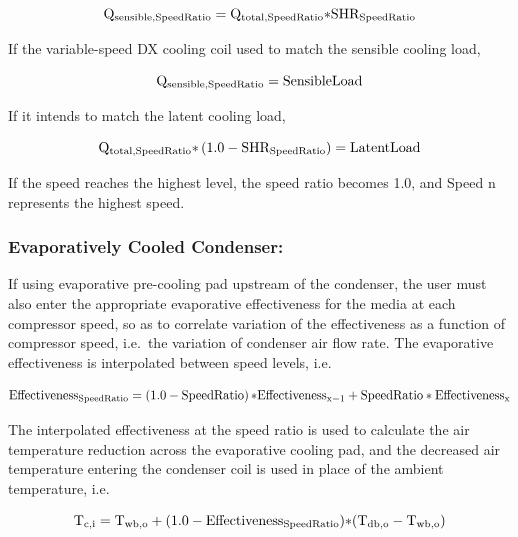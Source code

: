 \begin{equation}
{{\rm{Q}}_{{\rm{sensible}},{\rm{SpeedRatio}}}} = {{\rm{Q}}_{{\rm{total}},{\rm{SpeedRatio}}}}{\rm{*SH}}{{\rm{R}}_{{\rm{SpeedRatio}}}}
\end{equation}

If the variable-speed DX cooling coil used to match the sensible cooling load,

\begin{equation}
{{\rm{Q}}_{{\rm{sensible}},{\rm{SpeedRatio}}}} = {\rm{SensibleLoad}}
\end{equation}

If it intends to match the latent cooling load,

\begin{equation}
{{\rm{Q}}_{{\rm{total}},{\rm{SpeedRatio}}}}{\rm{*}}\left( {1.0 - {\rm{SH}}{{\rm{R}}_{{\rm{SpeedRatio}}}}} \right) = {\rm{LatentLoad}}
\end{equation}

If the speed reaches the highest level, the speed ratio becomes 1.0, and Speed n represents the highest speed.

\subsubsection{Evaporatively Cooled Condenser:}\label{evaporatively-cooled-condenser}

If using evaporative pre-cooling pad upstream of the condenser, the user must also enter the appropriate evaporative effectiveness for the media at each compressor speed, so as to correlate variation of the effectiveness as a function of compressor speed, i.e.~the variation of condenser air flow rate. The evaporative effectiveness is interpolated between speed levels, i.e.

\begin{equation}
{\rm{Effectivenes}}{{\rm{s}}_{{\rm{SpeedRatio}}}} = \left( {1.0 - {\rm{SpeedRatio}}} \right){\rm{*Effectivenes}}{{\rm{s}}_{{\rm{x}} - 1}} + {\rm{SpeedRatio*Effectivenes}}{{\rm{s}}_{\rm{x}}}
\end{equation}

The interpolated effectiveness at the speed ratio is used to calculate the air temperature reduction across the evaporative cooling pad, and the decreased air temperature entering the condenser coil is used in place of the ambient temperature, i.e.

\begin{equation}
{{\rm{T}}_{{\rm{c}},{\rm{i}}}} = {{\rm{T}}_{{\rm{wb}},{\rm{o}}}} + (1.0 - {\rm{Effectivenes}}{{\rm{s}}_{{\rm{SpeedRatio}}}}){\rm{*}}({{\rm{T}}_{{\rm{db}},{\rm{o}}}} - {{\rm{T}}_{{\rm{wb}},{\rm{o}}}})
\end{equation}

